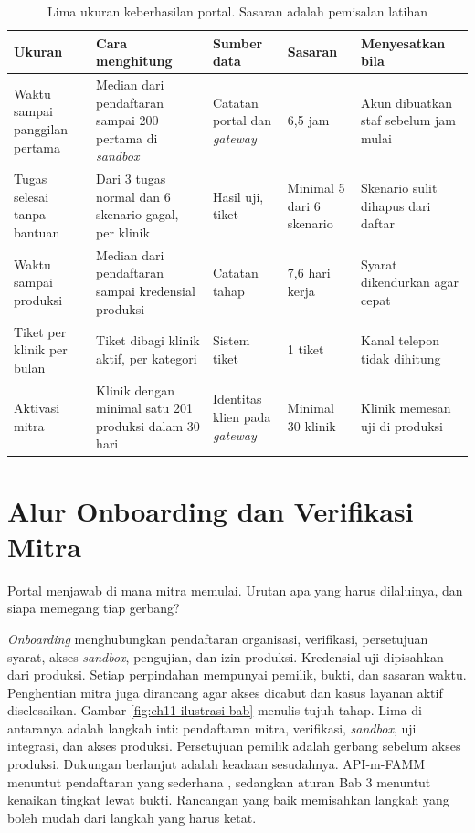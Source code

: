 \begin{table}[!htb]
  \centering
  \caption{Lima ukuran keberhasilan portal. Sasaran adalah pemisalan latihan}
  \label{tab:ch11-ukuran-portal}
  \footnotesize
  \begin{tabularx}{\textwidth}{H{2.35cm}GH{2.2cm}H{1.5cm}G}
    \hline
    \textbf{Ukuran} & \textbf{Cara menghitung} & \textbf{Sumber data} & \textbf{Sasaran} & \textbf{Menyesatkan bila} \\ \hline
    Waktu sampai panggilan pertama & Median dari pendaftaran sampai 200 pertama di \textit{sandbox} & Catatan portal dan \textit{gateway} & 6,5 jam & Akun dibuatkan staf sebelum jam mulai \\ \hline
    Tugas selesai tanpa bantuan & Dari 3 tugas normal dan 6 skenario gagal, per klinik & Hasil uji, tiket & Minimal 5 dari 6 skenario & Skenario sulit dihapus dari daftar \\ \hline
    Waktu sampai produksi & Median dari pendaftaran sampai kredensial produksi & Catatan tahap & 7,6 hari kerja & Syarat dikendurkan agar cepat \\ \hline
    Tiket per klinik per bulan & Tiket dibagi klinik aktif, per kategori & Sistem tiket & 1 tiket & Kanal telepon tidak dihitung \\ \hline
    Aktivasi mitra & Klinik dengan minimal satu 201 produksi dalam 30 hari & Identitas klien pada \textit{gateway} & Minimal 30 klinik & Klinik memesan uji di produksi \\ \hline
  \end{tabularx}
\end{table}

\section{Alur Onboarding dan Verifikasi Mitra}

Portal menjawab di mana mitra memulai. Urutan apa yang harus dilaluinya, dan siapa memegang tiap gerbang?

\textit{Onboarding} menghubungkan pendaftaran organisasi, verifikasi, persetujuan syarat, akses \textit{sandbox}, pengujian, dan izin
produksi. Kredensial uji dipisahkan dari produksi. Setiap perpindahan mempunyai pemilik, bukti, dan sasaran waktu. Penghentian mitra
juga dirancang agar akses dicabut dan kasus layanan aktif diselesaikan. Gambar \ref{fig:ch11-ilustrasi-bab} menulis tujuh tahap. Lima di
antaranya adalah langkah inti: pendaftaran mitra, verifikasi, \textit{sandbox}, uji integrasi, dan akses produksi. Persetujuan pemilik
adalah gerbang sebelum akses produksi. Dukungan berlanjut adalah keadaan sesudahnya. API-m-FAMM menuntut pendaftaran yang sederhana
\cite{mathijssen2020}, sedangkan aturan Bab 3 menuntut kenaikan tingkat lewat bukti. Rancangan yang baik memisahkan langkah yang
boleh mudah dari langkah yang harus ketat.

